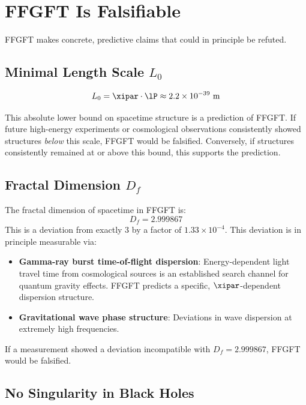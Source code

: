 \section{FFGFT Is Falsifiable}

FFGFT makes concrete, predictive claims that could in principle be refuted.

\subsection{Minimal Length Scale $L_0$}

\begin{equation}
  L_0 = \xipar \cdot \lP \approx 2.2 \times 10^{-39} \text{ m}
\end{equation}

This absolute lower bound on spacetime structure is a prediction of FFGFT. If future high-energy experiments or cosmological observations consistently showed structures \emph{below} this scale, FFGFT would be falsified. Conversely, if structures consistently remained at or above this bound, this supports the prediction.

\subsection{Fractal Dimension $D_f$}

The fractal dimension of spacetime in FFGFT is:
\begin{equation}
  D_f = 2.999867
\end{equation}
This is a deviation from exactly 3 by a factor of $1.33 \times 10^{-4}$. This deviation is in principle measurable via:
\begin{itemize}
  \item \textbf{Gamma-ray burst time-of-flight dispersion}: Energy-dependent light travel time from cosmological sources is an established search channel for quantum gravity effects. FFGFT predicts a specific, $\xipar$-dependent dispersion structure.
  \item \textbf{Gravitational wave phase structure}: Deviations in wave dispersion at extremely high frequencies.
\end{itemize}
If a measurement showed a deviation incompatible with $D_f = 2.999867$, FFGFT would be falsified.

\subsection{No Singularity in Black Holes}


